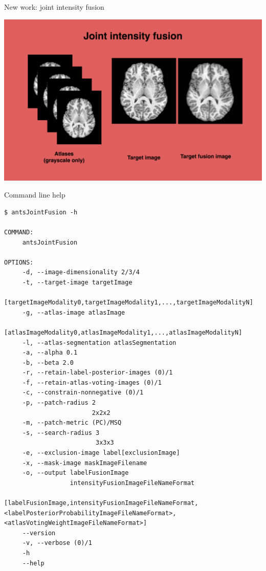 \documentclass[ignorenonframetext,]{beamer}
\begin{document}
\begin{frame}{New work: joint intensity fusion}

\includegraphics{./Figs/jointIntensityFusion.png}

\end{frame}

\begin{frame}[fragile]{Command line help}

\begin{verbatim}
$ antsJointFusion -h

COMMAND:
     antsJointFusion

OPTIONS:
     -d, --image-dimensionality 2/3/4
     -t, --target-image targetImage
                        [targetImageModality0,targetImageModality1,...,targetImageModalityN]
     -g, --atlas-image atlasImage
                       [atlasImageModality0,atlasImageModality1,...,atlasImageModalityN]
     -l, --atlas-segmentation atlasSegmentation
     -a, --alpha 0.1
     -b, --beta 2.0
     -r, --retain-label-posterior-images (0)/1
     -f, --retain-atlas-voting-images (0)/1
     -c, --constrain-nonnegative (0)/1
     -p, --patch-radius 2
                        2x2x2
     -m, --patch-metric (PC)/MSQ
     -s, --search-radius 3
                         3x3x3
     -e, --exclusion-image label[exclusionImage]
     -x, --mask-image maskImageFilename
     -o, --output labelFusionImage
                  intensityFusionImageFileNameFormat
                  [labelFusionImage,intensityFusionImageFileNameFormat,<labelPosteriorProbabilityImageFileNameFormat>,<atlasVotingWeightImageFileNameFormat>]
     --version
     -v, --verbose (0)/1
     -h
     --help
\end{verbatim}

\end{frame}
\end{document}
